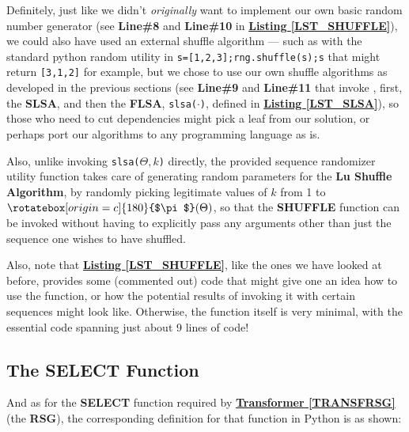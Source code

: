 \documentclass[a4paper, 18pt]{book} %
\newcommand{\invpi}{\rotatebox[origin=c]{180}{$\pi$}}
\begin{document}
Definitely, just like we didn't \textit{originally} want to implement our own basic random number generator (see \textbf{Line\#8} and \textbf{Line\#10} in \textbf{\hyperref[LST_SHUFFLE]{Listing \ref{LST_SHUFFLE}}}), we could also have used an external shuffle algorithm --- such as with the standard python random utility in \texttt{s=[1,2,3];rng.shuffle(s);s} that might return \texttt{[3,1,2]} for example, but we chose to use our own shuffle algorithms as developed in the previous sections (see \textbf{Line\#9} and \textbf{Line\#11} that invoke , first, the \textbf{SLSA}, and then the \textbf{FLSA}, \texttt{slsa($\cdot$)}, defined in \textbf{\hyperref[LST_SLSA]{Listing \ref{LST_SLSA}}}), so those who need to cut dependencies might pick a leaf from our solution, or perhaps port our algorithms to any programming language as is. 

Also, unlike invoking  \texttt{slsa($\Theta, k$)} directly, the provided sequence randomizer utility function takes care of generating random parameters for the \textbf{Lu Shuffle Algorithm}, by randomly picking legitimate values of $k$ from 1 to $\invpi(\Theta)$, so that the \textbf{SHUFFLE} function can be invoked without having to explicitly pass any arguments other than just the sequence one wishes to have shuffled.

Also, note that \textbf{\hyperref[LST_SHUFFLE]{Listing \ref{LST_SHUFFLE}}}, like the ones we have looked at before, provides some (commented out) code that might give one an idea how to use the function, or how the potential results of invoking it with certain sequences might look like. Otherwise, the function itself is very minimal, with the essential code spanning just about 9 lines of code!



\subsection{The SELECT Function}

And as for the \textbf{SELECT} function required by \textbf{\hyperref[TRANSFRSG]{Transformer \ref{TRANSFRSG}}} (the \textbf{RSG}), the corresponding definition for that function in Python is as shown:
\end{document}
